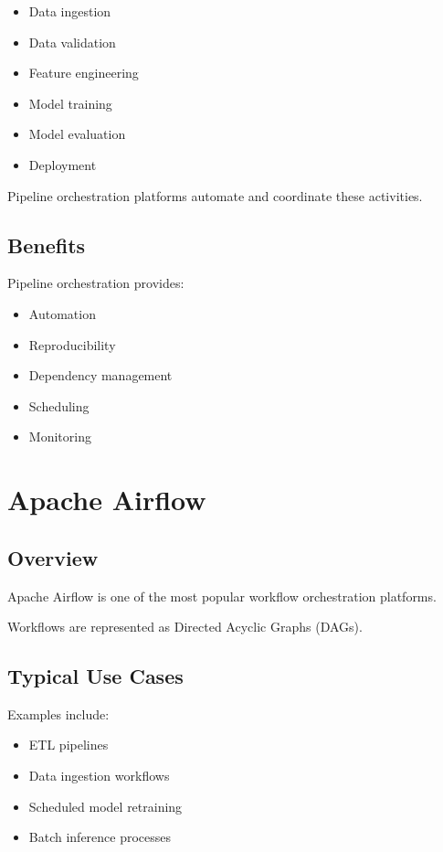 \begin{itemize}
    \item Data ingestion
    \item Data validation
    \item Feature engineering
    \item Model training
    \item Model evaluation
    \item Deployment
\end{itemize}

Pipeline orchestration platforms automate and coordinate these activities.

\subsection{Benefits}

Pipeline orchestration provides:

\begin{itemize}
    \item Automation
    \item Reproducibility
    \item Dependency management
    \item Scheduling
    \item Monitoring
\end{itemize}

\section{Apache Airflow}

\subsection{Overview}

Apache Airflow is one of the most popular workflow orchestration platforms.

Workflows are represented as Directed Acyclic Graphs (DAGs).

\subsection{Typical Use Cases}

Examples include:

\begin{itemize}
    \item ETL pipelines
    \item Data ingestion workflows
    \item Scheduled model retraining
    \item Batch inference processes
\end{itemize}

